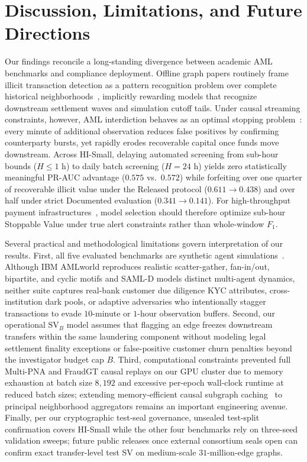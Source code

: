 \documentclass[pdflatex,sn-mathphys,Numbered]{sn-jnl}
\theoremstyle{thmstyleone}
\begin{document}
\section{Discussion, Limitations, and Future Directions}\label{sec:discussion}

Our findings reconcile a long-standing divergence between academic AML benchmarks and compliance deployment. Offline graph papers routinely frame illicit transaction detection as a pattern recognition problem over complete historical neighborhoods~\cite{egressy2024multigraph,lin2024fraudgt,altman2023ibmaml}, implicitly rewarding models that recognize downstream settlement waves and simulation cutoff tails. Under causal streaming constraints, however, AML interdiction behaves as an optimal stopping problem~\cite{mori2018early,lan1983alpha}: every minute of additional observation reduces false positives by confirming counterparty bursts, yet rapidly erodes recoverable capital once funds move downstream. Across HI-Small, delaying automated screening from sub-hour bounds ($H \le 1\text{ h}$) to daily batch screening ($H = 24\text{ h}$) yields zero statistically meaningful PR-AUC advantage ($0.575$ vs.\ $0.572$) while forfeiting over one quarter of recoverable illicit value under the Released protocol ($0.611 \to 0.438$) and over half under strict Documented evaluation ($0.341 \to 0.141$). For high-throughput payment infrastructures~\cite{eu2024instant}, model selection should therefore optimize sub-hour Stoppable Value under true alert constraints rather than whole-window $F_1$.

Several practical and methodological limitations govern interpretation of our results. First, all five evaluated benchmarks are synthetic agent simulations~\cite{altman2023ibmaml,oztas2023samld}. Although IBM AMLworld reproduces realistic scatter-gather, fan-in/out, bipartite, and cyclic motifs and SAML-D models distinct multi-agent dynamics, neither suite captures real-bank customer due diligence KYC attributes, cross-institution dark pools, or adaptive adversaries who intentionally stagger transactions to evade $10$-minute or $1$-hour observation buffers. Second, our operational $\text{SV}_B$ model assumes that flagging an edge freezes downstream transfers within the same laundering component without modeling legal settlement finality exceptions or false-positive customer churn penalties beyond the investigator budget cap $B$. Third, computational constraints prevented full Multi-PNA and FraudGT causal replays on our GPU cluster due to memory exhaustion at batch size $8{,}192$ and excessive per-epoch wall-clock runtime at reduced batch sizes; extending memory-efficient causal subgraph caching~\cite{blanusa2024gfp,streamtgn2026} to principal neighborhood aggregators remains an important engineering avenue. Finally, per our cryptographic test-seal governance, unsealed test-split confirmation covers HI-Small while the other four benchmarks rely on three-seed validation sweeps; future public releases once external consortium seals open can confirm exact transfer-level test SV on medium-scale $31$-million-edge graphs.
\end{document}
